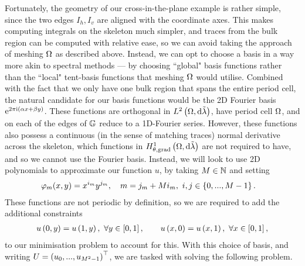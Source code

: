 Fortunately, the geometry of our cross-in-the-plane example is rather simple, since the two edges $I_h, I_v$ are aligned with the coordinate axes.
This makes computing integrals on the skeleton much simpler, and traces from the bulk region can be computed with relative ease, so we can avoid taking the approach of meshing $\Omega$ as described above.
Instead, we can opt to choose a basis in a way more akin to spectral methods --- by choosing ``global" basis functions rather than the ``local" tent-basis functions that meshing $\Omega$ would utilise.
Combined with the fact that we only have one bulk region that spans the entire period cell, the natural candidate for our basis functions would be the 2D Fourier basis $\mathrm{e}^{2\pi\mathrm{i}(\alpha x + \beta y)}$.
These functions are orthogonal in $L^{2}\left( \Omega,\mathrm{d}\tilde{\lambda} \right)$, have period cell $\Omega$, and on each of the edges of $\mathbb{G}$ reduce to a 1D-Fourier series.
However, these functions also possess a continuous (in the sense of matching traces) normal derivative across the skeleton, which functions in $H^1_{\theta, \mathrm{grad}}\left( \Omega, \mathrm{d}\tilde{\lambda} \right)$ are not required to have, and so we cannot use the Fourier basis.
Instead, we will look to use 2D polynomials to approximate our function $u$, by taking $M\in\mathbb{N}$ and setting
\begin{align} \label{eq:2DPolyBasisDef}
	\varphi_m(x,y) &= x^{i_m} y^{j_m}, \quad m = j_m + Mi_m, \ i,j\in\clbracs{0,...,M-1}.
\end{align}
These functions are not periodic by definition, so we are required to add the additional constraints
\begin{align*}
	u\left( 0,y \right) = u\left( 1,y \right), \ \forall y\in\left[ 0,1 \right], 
	\qquad 
	u\left( x,0 \right) = u\left( x,1 \right), \ \forall x\in\left[ 0,1 \right],
\end{align*}
to our minimisation problem to account for this.
With this choice of basis, and writing $U = \left( u_0,...,u_{M^2-1} \right)^\top$, we are tasked with solving the following problem.

